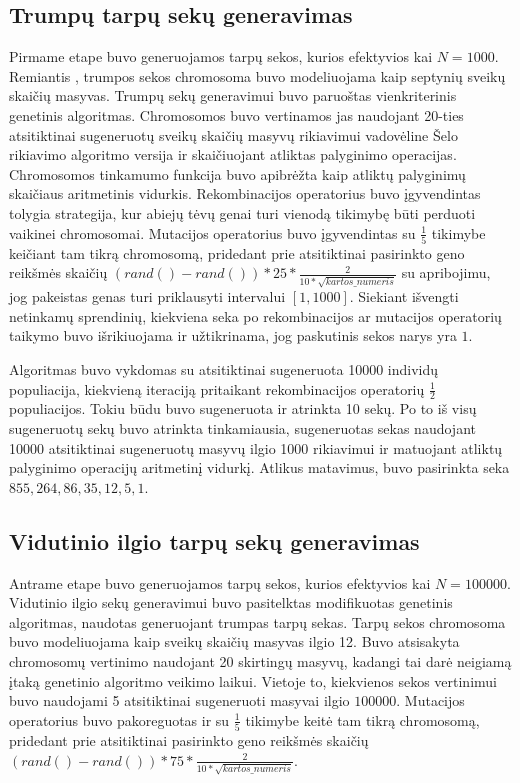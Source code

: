 \documentclass{VUMIFInfKursinis}
\begin{document}
\subsection{Trumpų tarpų sekų generavimas}
Pirmame etape buvo generuojamos tarpų sekos, kurios efektyvios kai $N=1000$.
Remiantis \cite{simpson1999faster}, trumpos sekos chromosoma buvo modeliuojama kaip
septynių sveikų skaičių masyvas.
Trumpų sekų generavimui buvo paruoštas vienkriterinis genetinis algoritmas.
Chromosomos buvo vertinamos jas naudojant 20-ties atsitiktinai
sugeneruotų sveikų skaičių masyvų rikiavimui vadovėline Šelo rikiavimo algoritmo versija ir skaičiuojant atliktas palyginimo operacijas.
Chromosomos tinkamumo funkcija buvo apibrėžta kaip atliktų palyginimų skaičiaus aritmetinis vidurkis.
Rekombinacijos operatorius buvo įgyvendintas tolygia strategija, kur abiejų tėvų genai turi vienodą tikimybę
būti perduoti vaikinei chromosomai.
Mutacijos operatorius buvo įgyvendintas su $\frac{1}{5}$ tikimybe keičiant tam tikrą chromosomą,
pridedant prie atsitiktinai pasirinkto geno reikšmės skaičių $(rand()-rand())*25*\frac{2}{10*\sqrt{kartos\_numeris}}$ su apribojimu, jog pakeistas genas turi priklausyti intervalui $[1, 1000]$.
Siekiant išvengti netinkamų sprendinių, kiekviena seka po rekombinacijos ar mutacijos operatorių taikymo buvo išrikiuojama ir
užtikrinama, jog paskutinis sekos narys yra $1$.

Algoritmas buvo vykdomas su atsitiktinai sugeneruota 10000 individų populiacija, kiekvieną iteraciją pritaikant rekombinacijos operatorių
$\frac{1}{2}$ populiacijos.
Tokiu būdu buvo sugeneruota ir atrinkta 10 sekų.
Po to iš visų sugeneruotų sekų buvo atrinkta tinkamiausia, sugeneruotas sekas naudojant 10000 atsitiktinai sugeneruotų masyvų ilgio 1000 rikiavimui
ir matuojant atliktų palyginimo operacijų aritmetinį vidurkį.
Atlikus matavimus, buvo pasirinkta seka $855, 264, 86, 35, 12, 5, 1$.

\subsection{Vidutinio ilgio tarpų sekų generavimas}
Antrame etape buvo generuojamos tarpų sekos, kurios efektyvios kai $N=100000$.
Vidutinio ilgio sekų generavimui buvo pasitelktas modifikuotas genetinis algoritmas, naudotas generuojant trumpas tarpų sekas.
Tarpų sekos chromosoma buvo modeliuojama kaip sveikų skaičių masyvas ilgio 12.
Buvo atsisakyta chromosomų vertinimo naudojant 20 skirtingų masyvų, kadangi tai darė neigiamą įtaką genetinio algoritmo veikimo laikui.
Vietoje to, kiekvienos sekos vertinimui buvo naudojami 5 atsitiktinai sugeneruoti masyvai ilgio $100000$.
Mutacijos operatorius buvo pakoreguotas ir su $\frac{1}{5}$ tikimybe keitė tam tikrą chromosomą,
pridedant prie atsitiktinai pasirinkto geno reikšmės skaičių $(rand()-rand())*75*\frac{2}{10*\sqrt{kartos\_numeris}}$.
\end{document}
